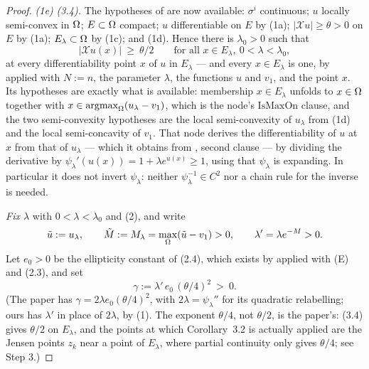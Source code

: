 \begin{proof}
\emph{(1e) (3.4).} The hypotheses of  are now
available: $\sigma^{i}$ continuous; $u$ locally semi-convex in $\Omega$; $E\subset\Omega$
compact; $u$ differentiable on $E$ by (1a); $|\mathcal Xu|\ge\theta>0$ on $E$ by (1a);
$E_\lambda\subset\Omega$ by (1c); and (1d). Hence there is $\lambda_0>0$ such that
\[
 |\mathcal Xu(x)|\ \ge\ \theta/2\qquad\text{for all }x\in E_\lambda,\ 0<\lambda<\lambda_0,
 \tag{4}
\]
at every differentiability point $x$ of $u$ in $E_\lambda$ --- and every $x\in E_\lambda$
is one, by  applied with $N:=n$, the parameter
$\lambda$, the functions $u$ and $v_1$, and the point $x$. Its hypotheses are exactly what
is available: membership $x\in E_\lambda$ unfolds to $x\in\Omega$ together with
$x\in\mathrm{argmax}_\Omega(u_\lambda-v_1)$, which is the node's $\mathrm{IsMaxOn}$ clause, and
the two semi-convexity hypotheses are the local semi-convexity of $u_\lambda$ from (1d) and
the local semi-concavity of $v_1$. That node derives the differentiability of $u$ at $x$
from that of $u_\lambda$ --- which it obtains from , second
clause --- by dividing the derivative by $\psi_\lambda'(u(x))=1+\lambda e^{u(x)}\ge1$,
using that $\psi_\lambda$ is expanding. In particular it does not invert $\psi_\lambda$:
neither $\psi_\lambda^{-1}\in C^{2}$ nor a chain rule for the inverse is needed.

\emph{Fix $\lambda$} with $0<\lambda<\lambda_0$ and (2), and write
\[
 \tilde u:=u_\lambda,\qquad \tilde M:=M_\lambda=\max_\Omega(\tilde u-v_1)>0,\qquad
 \lambda'=\lambda e^{-M}>0 .
\]
Let $e_0>0$ be the ellipticity constant of (2.4), which exists by
 applied with (E) and (2.3), and set
\[
 \gamma:=\lambda'\,e_0\,(\theta/4)^{2}\ >\ 0 . \tag{5}
\]
(The paper has $\gamma=2\lambda e_0(\theta/4)^{2}$, with $2\lambda=\psi_\lambda''$ for its
quadratic relabelling; ours has $\lambda'$ in place of $2\lambda$, by (1). The exponent
$\theta/4$, not $\theta/2$, is the paper's: (3.4) gives $\theta/2$ on $E_\lambda$,
and the points at which Corollary~3.2 is actually applied are the Jensen points $z_k$ near a
point of $E_\lambda$, where partial continuity only gives $\theta/4$; see Step 3.)


\end{proof}
